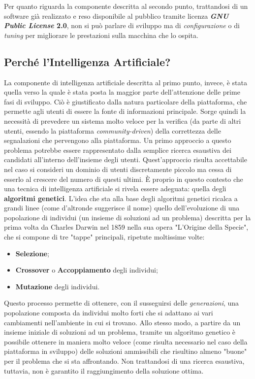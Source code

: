         Per quanto riguarda la componente descritta al secondo punto, trattandosi di un software già realizzato e reso disponibile al pubblico tramite licenza \textbf{\textit{GNU Public License} 2.0}, non si può parlare di sviluppo ma di \textit{configurazione} o di \textit{tuning} per migliorare le prestazioni sulla macchina che lo ospita.

        \subsection{Perché l'Intelligenza Artificiale?}
            La componente di intelligenza artificiale descritta al primo punto, invece, è stata quella verso la quale è stata posta la maggior parte dell'attenzione delle prime fasi di sviluppo. Ciò è giustificato dalla natura particolare della piattaforma, che permette agli utenti di essere la fonte di informazioni principale. Sorge quindi la necessità di prevedere un sistema molto veloce per la verifica (da parte di altri utenti, essendo la piattaforma \textit{community-driven}) della correttezza delle segnalazioni che pervengono alla piattaforma.  Un primo approccio a questo problema potrebbe essere rappresentato dalla semplice ricerca esaustiva dei candidati all'interno dell'insieme degli utenti. Quest'approccio risulta accettabile nel caso si consideri un dominio di utenti discretamente piccolo ma cessa di esserlo al crescere del numero di questi ultimi. È proprio in questo contesto che una tecnica di intelligenza artificiale si rivela essere adeguata: quella degli \textbf{algoritmi genetici}. L'idea che sta alla base degli algoritmi genetici ricalca a grandi linee (come d'altronde suggerisce il nome) quello dell'evoluzione di una popolazione di individui (un insieme di soluzioni ad un problema) descritta per la prima volta da Charles Darwin nel 1859 nella sua opera "L'Origine della Specie", che si compone di tre "tappe" principali, ripetute moltissime volte:

            \begin{itemize}
                \item \textbf{Selezione};
                \item \textbf{Crossover} o \textbf{Accoppiamento} degli individui;
                \item \textbf{Mutazione} degli individui.
            \end{itemize}

            Questo processo permette di ottenere, con il susseguirsi delle \textit{generazioni}, una popolazione composta da individui molto forti che si adattano ai vari cambiamenti nell'ambiente in cui si trovano.
            Allo stesso modo, a partire da un insieme iniziale di soluzioni ad un problema, tramite un algoritmo genetico è possibile ottenere in maniera molto veloce (come risulta necessario nel caso della piattaforma in sviluppo) delle soluzioni ammissibili che risultino almeno "buone" per il problema che si sta affrontando. Non trattandosi di una ricerca esaustiva, tuttavia, non è garantito il raggiungimento della soluzione ottima.

